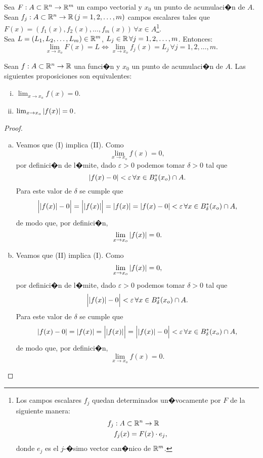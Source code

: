 \documentclass[a4paper]{scrartcl} %
\begin{document}
\begin{propiedad} \label{prop:lim_x_comp}
 Sea $F: A \subset \mathbb{R}^n \to \mathbb{R}^m$ un campo vectorial y $x_0$ un punto de acumulaci�n de $A$. Sean $f_j: A \subset \mathbb{R}^n \to \mathbb{R} \, (j = 1,2, \dots, m)$ campos escalares tales que $F(x) = \left( f_1(x), f_2(x), \dots, f_m(x) \right) \, \forall x \in A$\footnote{Los campos escalares $f_j$ quedan determinados un�vocamente por $F$ de la siguiente manera: 
 \begin{align*}
     f_j &: A \subset \mathbb{R}^n \to \mathbb{R} \\
     &f_j(x) = F(x) \cdot e_j,
 \end{align*} donde $e_j$ es el $j$-�simo vector can�nico de $\mathbb{R}^m$.}.\\
 Sea $L = \left( L_1, L_2, \dots, L_m \right) \in \mathbb{R}^m$, $L_j \in \mathbb{R} \, \forall j = 1,2, \dots, m$. Entonces:
 \[
  \lim_{x \to x_o} F(x) = L \iff \lim_{x \to x_o} f_j(x) = L_j \, \forall j = 1,2, \dots, m.
 \]

\end{propiedad}


  \begin{propiedad} \label{prop:lim_1}
    Sean $f:A \subset \mathbb{R}^n \to \mathbb{R}$ una funci�n y $x_0$ un punto de acumulaci�n de $A$. Las siguientes proposiciones son equivalentes:
 \begin{enumerate} [i.]
  \item $\lim_{x \to x_o} f(x) = 0$.
  \item $\lim_{x \to x_o} \abs{ f(x) } = 0$.
 \end{enumerate}
 \begin{proof}
 \mbox{}
 
 \begin{enumerate} [(a)]
  \item Veamos que (I) implica (II). Como 
  \[
   \lim_{x \to x_o} f(x) = 0,
  \]
  por definici�n de l�mite, dado $\varepsilon > 0$ podemos tomar $\delta > 0$ tal que 
  \[
   \abs{f(x) - 0} < \varepsilon \, \forall x \in B^*_{\delta}(x_o) \cap A.
  \]
  Para este valor de $\delta$ se cumple que
  \[
   \Big| \abs{f(x)} - 0 \Big| = \Big| \abs{f(x)} \Big| = \abs{f(x)} = \abs{f(x) - 0} < \varepsilon \, 
   \forall x \in B^*_{\delta}(x_o) \cap A,
  \]
  de modo que, por definici�n, 
  \[
   \lim_{x \to x_o} \abs{ f(x) } = 0.
  \]
  \item Veamos que (II) implica (I). Como
  \[
   \lim_{x \to x_o} \abs{ f(x) } = 0,
  \]
  por definici�n de l�mite, dado $\varepsilon > 0$ podemos tomar $\delta > 0$ tal que 
  \[
   \Big| \abs{f(x)} - 0 \Big| < \varepsilon \, \forall x \in B^*_{\delta}(x_o) \cap A.
  \]
  Para este valor de $\delta$ se cumple que
  \[
   \abs{f(x) - 0} = \abs{f(x)} = \Big| \abs{f(x)} \Big| = \Big| \abs{f(x)} - 0 \Big| < \varepsilon \, 
   \forall x \in B^*_{\delta}(x_o) \cap A,
  \]
  de modo que, por definici�n, 
  \[
   \lim_{x \to x_o} f(x) = 0.
  \]
 \end{enumerate}

  
 \end{proof}

\end{propiedad} 
\end{document}
